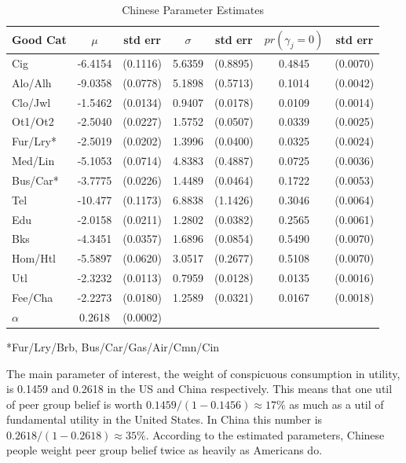 \documentclass[12pt]{article}
\begin{document}
\begin{table}
    \centering
	\begin{tabular}{|l|c c |c c |c c|}
		\hline
		Good Cat & $\mu$ & std err      & $\sigma$ & std err       & $pr(\gamma_j =  0)$ & std err\\
		\hline
		Cig         & -6.4154 &  (0.1116) & 5.6359 & (0.8895) & 0.4845 & (0.0070)\\ 
		\hline
		Alo/Alh     & -9.0358 &  (0.0778) & 5.1898 & (0.5713) & 0.1014 & (0.0042)\\ 
		\hline
		Clo/Jwl     & -1.5462 &  (0.0134) & 0.9407 & (0.0178) & 0.0109 & (0.0014)\\ 
		\hline
		Ot1/Ot2     & -2.5040 &  (0.0227) & 1.5752 & (0.0507) & 0.0339 & (0.0025)\\ 
		\hline
		Fur/Lry* & -2.5019 &  (0.0202) & 1.3996 & (0.0400) & 0.0325 & (0.0024)\\ 
		\hline
		Med/Lin     & -5.1053 &  (0.0714) & 4.8383 & (0.4887) & 0.0725 & (0.0036)\\ 
		\hline
		Bus/Car* & -3.7775 &  (0.0226) & 1.4489 & (0.0464) & 0.1722 & (0.0053)\\ 
		\hline
		Tel         & -10.477 &  (0.1173) & 6.8838 & (1.1426) & 0.3046 & (0.0064)\\ 
		\hline
		Edu         & -2.0158 &  (0.0211) & 1.2802 & (0.0382) & 0.2565 & (0.0061)\\ 
		\hline
		Bks         & -4.3451 &  (0.0357) & 1.6896 & (0.0854) & 0.5490 & (0.0070)\\ 
		\hline
		Hom/Htl     & -5.5897 &  (0.0620) & 3.0517 & (0.2677) & 0.5108 & (0.0070)\\ 
		\hline
		Utl         & -2.3232 &  (0.0113) & 0.7959 & (0.0128) & 0.0135 & (0.0016)\\ 
		\hline
		Fee/Cha     & -2.2273 &  (0.0180) & 1.2589 & (0.0321) & 0.0167 & (0.0018)\\ 
		\hline
	        \hline	
		$\alpha$ & 0.2618 & (0.0002) & & & & \\
		\hline
	\end{tabular}
     	\linebreak
	\small{*Fur/Lry/Brb, Bus/Car/Gas/Air/Cmn/Cin}
    \caption{Chinese Parameter Estimates}
    \label{tab:chnparest}
\end{table}
The main parameter of interest, the weight of conspicuous consumption in utility, is 0.1459 and 0.2618 in the US and China respectively.  This means that one util of peer group belief is worth $0.1459/(1-0.1456) \approx 17\%$ as much as a util of fundamental utility in the United States.  In China this number is $0.2618/(1-0.2618) \approx 35\%$.  According to the estimated parameters, Chinese people weight peer group belief twice as heavily as Americans do.
\end{document}
